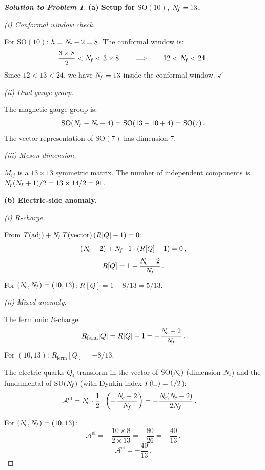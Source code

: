 \documentclass[11pt,a4paper]{article}
\newcommand{\SO}[1]{\mathrm{SO}(#1)}
\begin{document}
\begin{proof}[\textbf{Solution to Problem 1}]

\textbf{(a) Setup for $\SO{10}$, $N_{\!f} = 13$.}

\textit{(i) Conformal window check.}

For $\SO{10}$: $h = N_{\!c} - 2 = 8$.  The conformal window is:
\[
  \frac{3 \times 8}{2} < N_{\!f} < 3 \times 8
  \qquad\Longrightarrow\qquad
  12 < N_{\!f} < 24\,.
\]
Since $12 < 13 < 24$, we have $N_{\!f} = 13$ inside the conformal window.
\quad$\checkmark$

\textit{(ii) Dual gauge group.}

The magnetic gauge group is:
\[
  \SO{\Nf - \Nc + 4} = \SO{13 - 10 + 4} = \SO{7}\,.
\]
The vector representation of $\SO{7}$ has dimension $7$.

\textit{(iii) Meson dimension.}

$M_{ij}$ is a $13 \times 13$ symmetric matrix.  The number of
independent components is $N_{\!f}(N_{\!f} + 1)/2 = 13 \times 14/2 = 91$.

\bigskip

\textbf{(b) Electric-side anomaly.}

\textit{(i) $R$-charge.}

From $T(\mathrm{adj}) + N_{\!f}\,T(\text{vector})\,(R[Q]-1) = 0$:
\[
  (N_{\!c} - 2) + N_{\!f} \cdot 1 \cdot (R[Q] - 1) = 0\,,
\]
\[
  R[Q] = 1 - \frac{N_{\!c} - 2}{N_{\!f}}\,.
\]
For $(N_{\!c}, N_{\!f}) = (10, 13)$:
$R[Q] = 1 - 8/13 = 5/13$.

\textit{(ii) Mixed anomaly.}

The fermionic $R$-charge:
\[
  R_{\text{ferm}}[Q] = R[Q] - 1 = -\frac{N_{\!c} - 2}{N_{\!f}}\,.
\]
For $(10, 13)$: $R_{\text{ferm}}[Q] = -8/13$.

The electric quarks $Q_i$ transform in the vector of $\SO{\Nc}$
(dimension $N_{\!c}$) and the fundamental of $\mathrm{SU}(N_{\!f})$ (with Dynkin
index $T(\square) = 1/2$):
\begin{align}
  \mathcal{A}^{\text{el}}
  &= N_{\!c} \cdot \frac{1}{2} \cdot
    \biggl(-\frac{N_{\!c} - 2}{N_{\!f}}\biggr)
  = -\frac{N_{\!c}(N_{\!c} - 2)}{2N_{\!f}}\,. \label{eq:Ael-SO}
\end{align}

For $(N_{\!c}, N_{\!f}) = (10, 13)$:
\[
  \mathcal{A}^{\text{el}}
  = -\frac{10 \times 8}{2 \times 13}
  = -\frac{80}{26}
  = -\frac{40}{13}\,.
\]
\[
  \boxed{\mathcal{A}^{\text{el}} = -\frac{40}{13}\,.}
\]


\end{proof}
\end{document}
